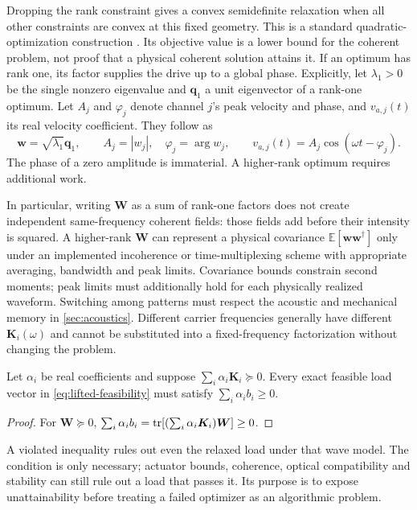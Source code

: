 Dropping the rank constraint gives a convex semidefinite relaxation when all
other constraints are convex at this fixed geometry. This is a standard
quadratic-optimization construction \cite{luo2010}. Its objective value is a
lower bound for the coherent problem, not proof that a physical coherent
solution attains it. If an optimum has rank one, its factor supplies the drive
up to a global phase. Explicitly, let $\lambda_1>0$ be the single nonzero
eigenvalue and $\bm q_1$ a unit eigenvector of a rank-one optimum. Let $A_j$
and $\varphi_j$ denote channel $j$'s peak velocity and phase, and $v_{a,j}(t)$
its real velocity coefficient. They follow as
\begin{equation}
 \bm w=\sqrt{\lambda_1}\bm q_1,\qquad
 A_j=|w_j|,\quad \varphi_j=\arg w_j,\qquad
 v_{a,j}(t)=A_j\cos(\omega t-\varphi_j).
 \label{eq:drive-recovery}
\end{equation}
The phase of a zero amplitude is immaterial. A higher-rank optimum requires
additional work.

In particular, writing $\bm W$ as a sum of rank-one factors does not create
independent same-frequency coherent fields: those fields add before their
intensity is squared. A higher-rank $\bm W$ can represent a physical covariance
$\mathbb E[\bm w\bm w^\dagger]$ only under an implemented incoherence or
time-multiplexing scheme with appropriate averaging, bandwidth and peak limits.
Covariance bounds constrain second moments; peak limits must additionally hold
for each physically realized waveform.
Switching among patterns must respect the acoustic and mechanical memory in
\cref{sec:acoustics}. Different carrier frequencies generally have different
$\bm K_i(\omega)$ and cannot be substituted into a fixed-frequency factorization
without changing the problem.

\begin{proposition}
Let $\alpha_i$ be real coefficients and suppose
$\sum_i\alpha_i\bm K_i\succeq0$. Every exact feasible load vector in
\cref{eq:lifted-feasibility} must satisfy $\sum_i\alpha_i b_i\geq0$.
\end{proposition}
\begin{proof}
For $\bm W\succeq0$,
$\sum_i\alpha_i b_i=\operatorname{tr}[(\sum_i\alpha_i\bm K_i)\bm W]\geq0$.
\end{proof}
A violated inequality rules out even the relaxed load under that wave model.
The condition is only necessary; actuator bounds, coherence, optical
compatibility and stability can still rule out a load that passes it. Its
purpose is to expose unattainability before treating a failed optimizer as an
algorithmic problem.

